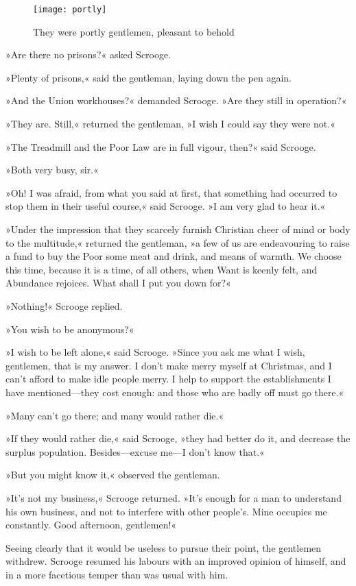 \begin{figure}[tbh]
\centering
  \texttt{[image: portly]}
  \caption{They were portly gentlemen, pleasant to behold}
\end{figure}

»Are there no prisons?« asked Scrooge.

»Plenty of prisons,« said the gentleman, laying down the pen again.

»And the Union workhouses?« demanded Scrooge. »Are they still in operation?«

»They are. Still,« returned the gentleman, »I wish I could say they were not.«

»The Treadmill and the Poor Law are in full vigour, then?« said Scrooge.

»Both very busy, sir.«

»Oh! I was afraid, from what you said at first, that something had occurred to stop them in their useful course,« said Scrooge. »I am very glad to hear it.«

»Under the impression that they scarcely furnish Christian cheer of mind or body to the multitude,« returned the gentleman, »a few of us are endeavouring to raise a fund to buy the Poor some meat and drink, and means of warmth. We choose this time, because it is a time, of all others, when Want is keenly felt, and Abundance rejoices. What shall I put you down for?«

»Nothing!« Scrooge replied.

»You wish to be anonymous?«

»I wish to be left alone,« said Scrooge. »Since you ask me what I wish, gentlemen, that is my answer. I don't make merry myself at Christmas, and I can't afford to make idle people merry. I help to support the establishments I have mentioned—they cost enough: and those who are badly off must go there.«

»Many can't go there; and many would rather die.«

»If they would rather die,« said Scrooge, »they had better do it, and decrease the surplus population. Besides—excuse me—I don't know that.«

»But you might know it,« observed the gentleman.

»It's not my business,« Scrooge returned. »It's enough for a man to understand his own business, and not to interfere with other people's. Mine occupies me constantly. Good afternoon, gentlemen!«

Seeing clearly that it would be useless to pursue their point, the gentlemen withdrew. Scrooge resumed his labours with an improved opinion of himself, and in a more facetious temper than was usual with him.

